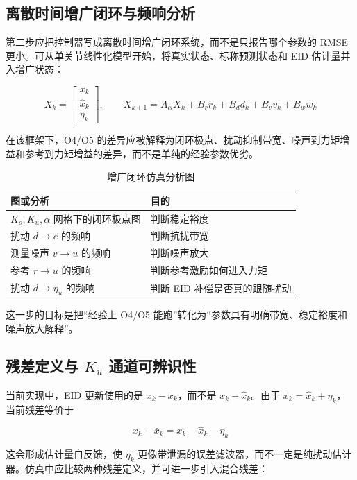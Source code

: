 \documentclass[12pt,a4paper]{ctexart}
\begin{document}
\subsection{离散时间增广闭环与频响分析}

第二步应把控制器写成离散时间增广闭环系统，而不是只报告哪个参数的 RMSE 更小。可从单关节线性化模型开始，将真实状态、标称预测状态和 EID 估计量并入增广状态：

\[
X_k=
\begin{bmatrix}
x_k\\
\hat{x}_k\\
\eta_k
\end{bmatrix},
\qquad
X_{k+1}=A_{cl}X_k+B_r r_k+B_d d_k+B_v v_k+B_w w_k
\]

在该框架下，O4/O5 的差异应被解释为闭环极点、扰动抑制带宽、噪声到力矩增益和参考到力矩增益的差异，而不是单纯的经验参数优劣。

\begin{table}[htbp]
\centering
\footnotesize
\caption{增广闭环仿真分析图}
\begin{tabularx}{\textwidth}{YY}
\toprule
图或分析 & 目的 \\
\midrule
$K_o,K_u,\alpha$ 网格下的闭环极点图 & 判断稳定裕度 \\
扰动 $d\rightarrow e$ 的频响 & 判断抗扰带宽 \\
测量噪声 $v\rightarrow u$ 的频响 & 判断噪声放大 \\
参考 $r\rightarrow u$ 的频响 & 判断参考激励如何进入力矩 \\
扰动 $d\rightarrow \eta_u$ 的频响 & 判断 EID 补偿是否真的跟随扰动 \\
\bottomrule
\end{tabularx}
\end{table}

这一步的目标是把“经验上 O4/O5 能跑”转化为“参数具有明确带宽、稳定裕度和噪声放大解释”。

\subsection{残差定义与 $K_u$ 通道可辨识性}

当前实现中，EID 更新使用的是 $x_k-\bar{x}_k$，而不是 $x_k-\hat{x}_k$。由于 $\bar{x}_k=\hat{x}_k+\eta_k$，当前残差等价于

\[
x_k-\bar{x}_k=x_k-\hat{x}_k-\eta_k
\]

这会形成估计量自反馈，使 $\eta_k$ 更像带泄漏的误差滤波器，而不一定是纯扰动估计器。仿真中应比较两种残差定义，并可进一步引入混合残差：
\end{document}
